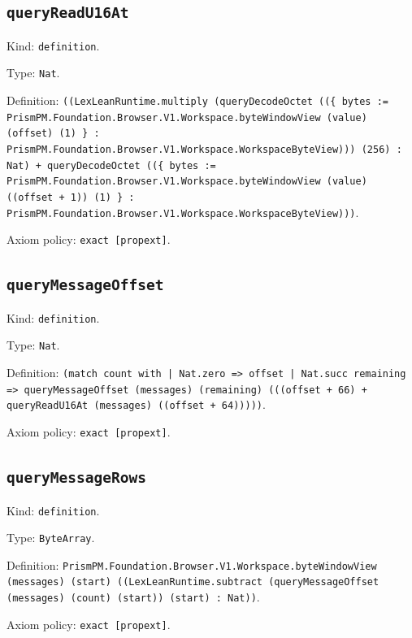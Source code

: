 \documentclass[11pt]{article}
\begin{document}
\subsection*{\texttt{queryReadU16At}}
\noindent Kind: \texttt{definition}.\par
\noindent Type: \texttt{Nat}.\par
\noindent Definition: \texttt{((LexLeanRuntime.multiply (queryDecodeOctet ((\{ bytes := PrismPM.Foundation.Browser.V1.Workspace.byteWindowView (value) (offset) (1) \} : PrismPM.Foundation.Browser.V1.Workspace.WorkspaceByteView))) (256) : Nat) + queryDecodeOctet ((\{ bytes := PrismPM.Foundation.Browser.V1.Workspace.byteWindowView (value) ((offset + 1)) (1) \} : PrismPM.Foundation.Browser.V1.Workspace.WorkspaceByteView)))}.\par
\noindent Axiom policy: \texttt{exact [propext]}.\par
\subsection*{\texttt{queryMessageOffset}}
\noindent Kind: \texttt{definition}.\par
\noindent Type: \texttt{Nat}.\par
\noindent Definition: \texttt{(match count with | Nat.zero => offset | Nat.succ remaining => queryMessageOffset (messages) (remaining) (((offset + 66) + queryReadU16At (messages) ((offset + 64)))))}.\par
\noindent Axiom policy: \texttt{exact [propext]}.\par
\subsection*{\texttt{queryMessageRows}}
\noindent Kind: \texttt{definition}.\par
\noindent Type: \texttt{ByteArray}.\par
\noindent Definition: \texttt{PrismPM.Foundation.Browser.V1.Workspace.byteWindowView (messages) (start) ((LexLeanRuntime.subtract (queryMessageOffset (messages) (count) (start)) (start) : Nat))}.\par
\noindent Axiom policy: \texttt{exact [propext]}.\par
\end{document}
